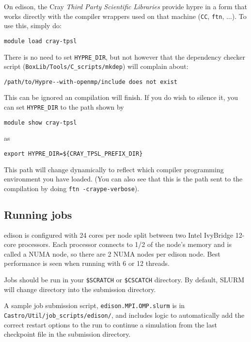 On edison, the Cray {\em Third Party Scientific Libraries} provide
{\sf hypre} in a form that works directly with the compiler wrappers
used on that machine ({\tt CC}, {\tt ftn}, $\ldots$).  To use this,
simply do:
\begin{verbatim}
module load cray-tpsl
\end{verbatim}
There is no need to set {\tt HYPRE\_DIR}, but not however that the 
dependency checker script ({\tt BoxLib/Tools/C\_scripts/mkdep}) will
complain about:
\begin{verbatim}
/path/to/Hypre--with-openmp/include does not exist
\end{verbatim}
This can be ignored an compilation will finish.  If you do wish to 
silence it, you can set {\tt HYPRE\_DIR} to the path shown by
\begin{verbatim}
module show cray-tpsl
\end{verbatim}
as
\begin{verbatim}
export HYPRE_DIR=${CRAY_TPSL_PREFIX_DIR}
\end{verbatim}
This path will change dynamically to reflect which compiler programming
environment you have loaded.  (You can also see that this is the path
sent to the compilation by doing {\tt ftn -craype-verbose}).


\subsection{Running jobs}

edison is configured with 24 cores per node split between two Intel             
IvyBridge 12-core processors.  Each processor connects to 1/2 of the            
node's memory and is called a NUMA node, so there are 2 NUMA nodes per          
edison node.  Best performance is seen when running with 6 or 12 threads.  

Jobs should be run in your {\tt \$SCRATCH} or {\tt \$CSCATCH} directory.
By default, SLURM will change directory into the submission directory.

A sample job submission script, {\tt edison.MPI.OMP.slurm} is in {\tt
  Castro/Util/job\_scripts/edison/}, and includes logic to
automatically add the correct restart options to the run to continue a
simulation from the last checkpoint file in the submission directory.

